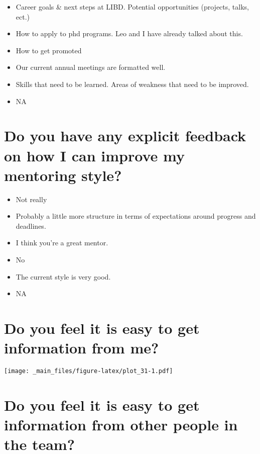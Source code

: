 \documentclass[
]{book}
\providecommand{\tightlist}{%
  \setlength{\itemsep}{0pt}\setlength{\parskip}{0pt}}
\begin{document}
\begin{itemize}
\tightlist
\item
  Career goals \& next steps at LIBD. Potential opportunities (projects, talks, ect.)
\item
  How to apply to phd programs. Leo and I have already talked about this.
\item
  How to get promoted
\item
  Our current annual meetings are formatted well.
\item
  Skills that need to be learned. Areas of weakness that need to be improved.
\item
  NA
\end{itemize}

\hypertarget{do-you-have-any-explicit-feedback-on-how-i-can-improve-my-mentoring-style}{%
\section{Do you have any explicit feedback on how I can improve my mentoring style?}\label{do-you-have-any-explicit-feedback-on-how-i-can-improve-my-mentoring-style}}

\begin{itemize}
\tightlist
\item
  Not really
\item
  Probably a little more structure in terms of expectations around progress and deadlines.
\item
  I think you're a great mentor.
\item
  No
\item
  The current style is very good.
\item
  NA
\end{itemize}

\hypertarget{do-you-feel-it-is-easy-to-get-information-from-me}{%
\section{Do you feel it is easy to get information from me?}\label{do-you-feel-it-is-easy-to-get-information-from-me}}

\texttt{[image: \_main\_files/figure-latex/plot\_31-1.pdf]}

\hypertarget{do-you-feel-it-is-easy-to-get-information-from-other-people-in-the-team}{%
\section{Do you feel it is easy to get information from other people in the team?}\label{do-you-feel-it-is-easy-to-get-information-from-other-people-in-the-team}}
\end{document}
